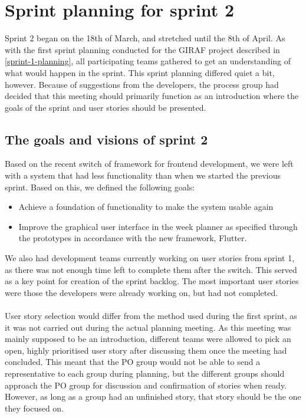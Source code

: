\section{Sprint planning for sprint 2}
Sprint 2 began on the 18th of March, and stretched until the 8th of April.
As with the first sprint planning conducted for the GIRAF project described in \autoref{sprint-1-planning}, all participating teams gathered to get an understanding of what would happen in the sprint.
This sprint planning differed quiet a bit, however.
Because of suggestions from the developers, the process group had decided that this meeting should primarily function as an introduction where the goals of the sprint and user stories should be presented.

\subsection{The goals and visions of sprint 2}
Based on the recent switch of framework for frontend development, we were left with a system that had less functionality than when we started the previous sprint.
Based on this, we defined the following goals:
\begin{itemize}
    \item Achieve a foundation of functionality to make the system usable again
    \item Improve the graphical user interface in the week planner as specified through the prototypes in accordance with the new framework, Flutter.
\end{itemize}
We also had development teams currently working on user stories from sprint 1, as there was not enough time left to complete them after the switch.
This served as a key point for creation of the sprint backlog.
The most important user stories were those the developers were already working on, but had not completed. 
\\\\
User story selection would differ from the method used during the first sprint, as it was not carried out during the actual planning meeting.
As this meeting was mainly supposed to be an introduction, different teams were allowed to pick an open, highly prioritised user story after discussing them once the meeting had concluded.
This meant that the PO group would not be able to send a representative to each group during planning, but the different groups should approach the PO group for discussion and confirmation of stories when ready.
However, as long as a group had an unfinished story, that story should be the one they focused on.
